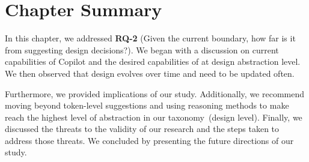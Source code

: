 \section{Chapter Summary}
In this chapter, we addressed \textbf{RQ-2} (Given the current boundary, how far is it from suggesting design decisions?). We began with a discussion on current capabilities of Copilot and the desired capabilities of \cct{} at design abstraction level. We then observed that design evolves over time and \cct{} need to be updated often.

Furthermore, we provided implications of our study. Additionally, we recommend moving beyond token-level suggestions and using reasoning methods to make \cct{} reach the highest level of abstraction in our taxonomy~(design level).
Finally, we discussed the threats to the validity of our research and the steps taken to address those threats. We concluded by presenting the future directions of our study. 